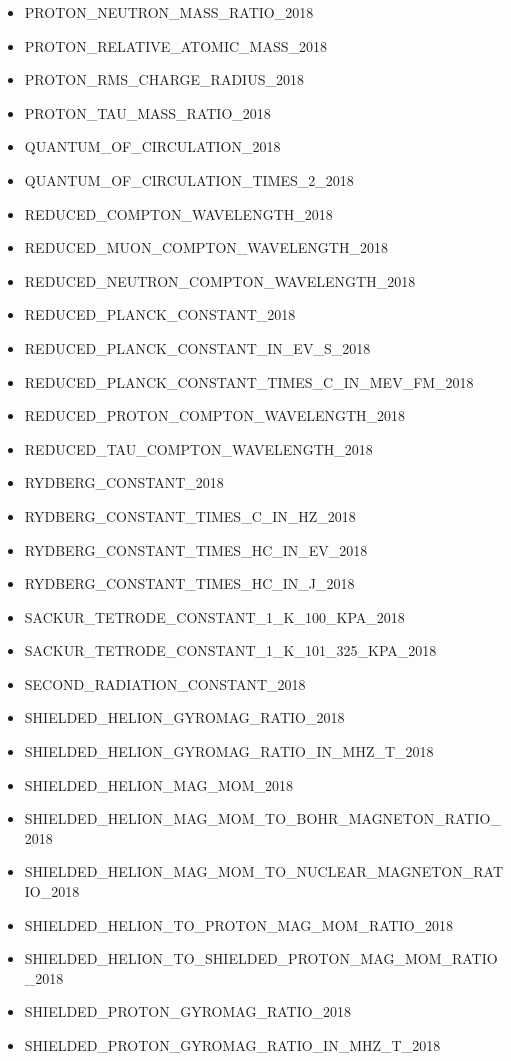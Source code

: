 \begin{itemize}
\item PROTON\_NEUTRON\_MASS\_RATIO\_2018
\item PROTON\_RELATIVE\_ATOMIC\_MASS\_2018
\item PROTON\_RMS\_CHARGE\_RADIUS\_2018
\item PROTON\_TAU\_MASS\_RATIO\_2018
\item QUANTUM\_OF\_CIRCULATION\_2018
\item QUANTUM\_OF\_CIRCULATION\_TIMES\_2\_2018
\item REDUCED\_COMPTON\_WAVELENGTH\_2018
\item REDUCED\_MUON\_COMPTON\_WAVELENGTH\_2018
\item REDUCED\_NEUTRON\_COMPTON\_WAVELENGTH\_2018
\item REDUCED\_PLANCK\_CONSTANT\_2018
\item REDUCED\_PLANCK\_CONSTANT\_IN\_EV\_S\_2018
\item REDUCED\_PLANCK\_CONSTANT\_TIMES\_C\_IN\_MEV\_FM\_2018
\item REDUCED\_PROTON\_COMPTON\_WAVELENGTH\_2018
\item REDUCED\_TAU\_COMPTON\_WAVELENGTH\_2018
\item RYDBERG\_CONSTANT\_2018
\item RYDBERG\_CONSTANT\_TIMES\_C\_IN\_HZ\_2018
\item RYDBERG\_CONSTANT\_TIMES\_HC\_IN\_EV\_2018
\item RYDBERG\_CONSTANT\_TIMES\_HC\_IN\_J\_2018
\item SACKUR\_TETRODE\_CONSTANT\_1\_K\_100\_KPA\_2018
\item SACKUR\_TETRODE\_CONSTANT\_1\_K\_101\_325\_KPA\_2018
\item SECOND\_RADIATION\_CONSTANT\_2018
\item SHIELDED\_HELION\_GYROMAG\_RATIO\_2018
\item SHIELDED\_HELION\_GYROMAG\_RATIO\_IN\_MHZ\_T\_2018
\item SHIELDED\_HELION\_MAG\_MOM\_2018
\item SHIELDED\_HELION\_MAG\_MOM\_TO\_BOHR\_MAGNETON\_RATIO\_2018
\item SHIELDED\_HELION\_MAG\_MOM\_TO\_NUCLEAR\_MAGNETON\_RATIO\_2018
\item SHIELDED\_HELION\_TO\_PROTON\_MAG\_MOM\_RATIO\_2018
\item SHIELDED\_HELION\_TO\_SHIELDED\_PROTON\_MAG\_MOM\_RATIO\_2018
\item SHIELDED\_PROTON\_GYROMAG\_RATIO\_2018
\item SHIELDED\_PROTON\_GYROMAG\_RATIO\_IN\_MHZ\_T\_2018

\end{itemize}

